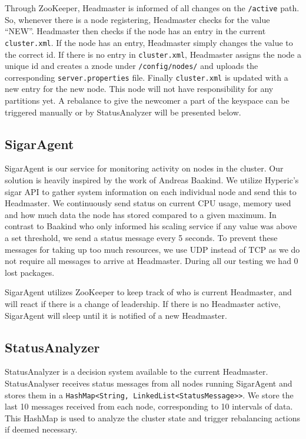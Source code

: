 Through ZooKeeper, Headmaster is informed of all changes on the \texttt{/active} path. So, whenever there is a node registering, Headmaster checks for the value ``NEW''. Headmaster then checks if the node has an entry in the current \texttt{cluster.xml}. If the node has an entry, Headmaster simply changes the value to the correct id. If there is no entry in \texttt{cluster.xml}, Headmaster assigns the node a unique id and creates a znode under \texttt{/config/nodes/} and uploads the corresponding \texttt{server.properties} file. Finally \texttt{cluster.xml} is updated with a new entry for the new node. This node will not have responsibility for any partitions yet. A rebalance to give the newcomer a part of the keyspace can be triggered manually or by StatusAnalyzer will be presented below.

\subsection{SigarAgent}
SigarAgent is our service for monitoring activity on nodes in the cluster. Our solution is heavily inspired by the work of Andreas Baakind\cite{baakind}. We utilize Hyperic's sigar API to gather system information on each individual node and send this to Headmaster. We continuously send status on current CPU usage, memory used and how much data the node has stored compared to a given maximum. In contrast to Baakind who only informed his scaling service if any value was above a set threshold, we send a status message every 5 seconds. To prevent these messages for taking up too much resources, we use UDP instead of TCP as we do not require all messages to arrive at Headmaster. During all our testing we had 0 lost packages.

SigarAgent utilizes ZooKeeper to keep track of who is current Headmaster, and will react if there is a change of leadership. If there is no Headmaster active, SigarAgent will sleep until it is notified of a new Headmaster. 

\subsection{StatusAnalyzer}
StatusAnalyzer is a decision system available to the current Headmaster. StatusAnalyser receives status messages from all nodes running SigarAgent and stores them in a \texttt{HashMap<String, LinkedList<StatusMessage>>}. We store the last 10 messages received from each node, corresponding to 10 intervals of data. This HashMap is used to analyze the cluster state and trigger rebalancing actions if deemed necessary.

